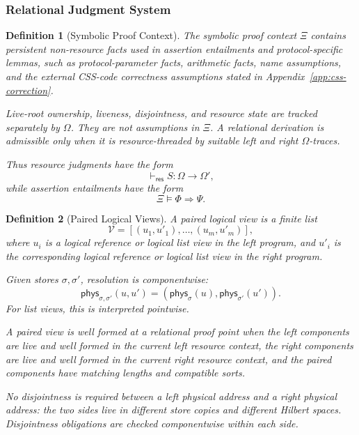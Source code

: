 \documentclass[acmsmall,screen,review,anonymous,nonacm]{acmart}
\newtheorem{definition}{Definition}[section]
\theoremstyle{defn_style}
\begin{document}
\subsubsection{\textbf{Relational Judgment System}}
\begin{definition}[Symbolic Proof Context]
The symbolic proof context \(\Xi\) contains persistent non-resource
facts used in assertion entailments and protocol-specific lemmas,
such as protocol-parameter facts, arithmetic facts, name assumptions, and the
external CSS-code correctness assumptions stated in
Appendix~\ref{app:css-correction}.

Live-root ownership, liveness, disjointness, and resource state are
tracked separately by \(\Omega\). They are not assumptions in
\(\Xi\). A relational derivation is admissible only when it is
resource-threaded by suitable left and right \(\Omega\)-traces.

Thus resource judgments have the form
\[
\vdash_{\mathsf{res}}S:\Omega\rightarrow\Omega',
\]
while assertion entailments have the form
\[
\Xi\vDash \Phi\Longrightarrow\Psi.
\]
\end{definition}

\begin{definition}[Paired Logical Views]
A paired logical view is a finite list
\[
\mathcal V=
[(u_1,u'_1),\ldots,(u_m,u'_m)],
\]
where \(u_i\) is a logical reference or logical list view in the left program,
and \(u'_i\) is the corresponding logical reference or logical list view in
the right program.

Given stores \(\sigma,\sigma'\), resolution is componentwise:
\[
\mathsf{phys}_{\sigma,\sigma'}(u,u')
=
\left(
\mathsf{phys}_{\sigma}(u),
\mathsf{phys}_{\sigma'}(u')
\right).
\]
For list views, this is interpreted pointwise.

A paired view is well formed at a relational proof point when the left
components are live and well formed in the current left resource context, the
right components are live and well formed in the current right resource
context, and the paired components have matching lengths and compatible sorts.

No disjointness is required between a left physical address and a right physical
address: the two sides live in different store copies and different Hilbert
spaces. Disjointness obligations are checked componentwise within each side.
\end{definition}
\end{document}
